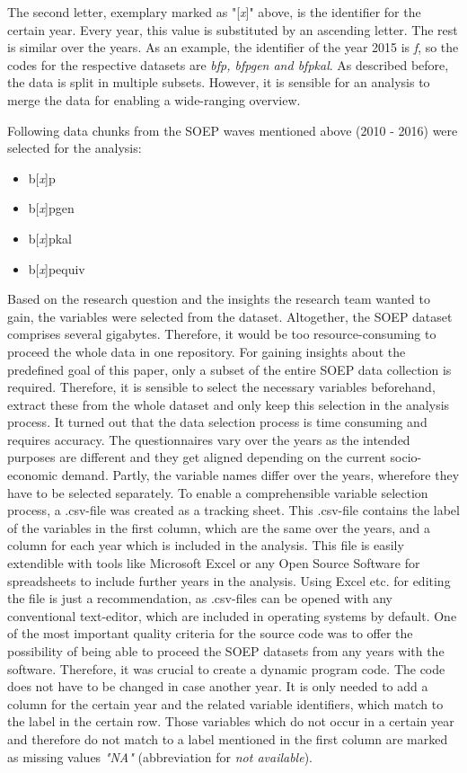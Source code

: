 \documentclass[a4paper]{article}
\begin{document}
The second letter, exemplary marked as "[\textit{x}]" above, is the identifier for the certain year. Every year, this value is substituted by an ascending letter. The rest is similar over the years. 
As an example, the identifier of the year 2015 is \textit{f}, so the codes for the respective datasets are \textit{bfp, bfpgen and bfpkal}.
As described before, the data is split in multiple subsets. However, it is sensible for an analysis to merge the data for enabling a wide-ranging overview.

Following data chunks from the SOEP waves mentioned above (2010 - 2016)  were selected for the analysis:
\begin{itemize}
\item{b[\textit{x}]p}
\item{b[\textit{x}]pgen}
\item{b[\textit{x}]pkal}
\item{b[\textit{x}]pequiv}
\end{itemize}

Based on the research question and the insights the research team wanted to gain, the variables were selected from the dataset. \newline
Altogether, the SOEP dataset comprises several gigabytes. Therefore, it would be too resource-consuming to proceed the whole data in one repository. For gaining insights about the predefined goal of this paper, only a subset of the entire SOEP data collection is required. Therefore, it is sensible to select the necessary variables beforehand, extract these from the whole dataset and only keep this selection in the analysis process. 
It turned out that the data selection process is time consuming and requires accuracy. The questionnaires vary over the years as the intended purposes are different and they get aligned depending on the current socio-economic demand. Partly, the variable names differ over the years, wherefore they have to be selected separately. To enable a comprehensible variable selection process, a .csv-file was created as a tracking sheet. This .csv-file contains the label of the variables in the first column, which are the same over the years, and a column for each year which is included in the analysis. This file is easily extendible with tools like Microsoft Excel or any Open Source Software for spreadsheets to include further years in the analysis. Using Excel etc. for editing the file is just a recommendation, as .csv-files can be opened with any conventional text-editor, which are included in operating systems by default. \newline 
One of the most important quality criteria for the source code was to offer the possibility of being able to proceed the SOEP datasets from any years with the software. Therefore, it was crucial to create a dynamic program code. The code does not have to be changed in case another year. It is only needed to add a column for the certain year and the related variable identifiers, which match to the label in the certain row. Those variables which do not occur in a certain year and therefore do not match to a label mentioned in the first column are marked as missing values \textit{"NA"} (abbreviation for \textit{not available}).
\end{document}
